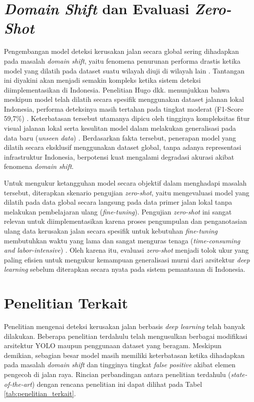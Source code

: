 \section{\textit{Domain Shift} dan Evaluasi \textit{Zero-Shot}}
Pengembangan model deteksi kerusakan jalan secara global sering dihadapkan pada masalah \textit{domain shift}, yaitu fenomena penurunan performa drastis ketika model yang dilatih pada dataset suatu wilayah diuji di wilayah lain \cite{Arya2024846}. Tantangan ini diyakini akan menjadi semakin kompleks ketika sistem deteksi diimplementasikan di Indonesia. Penelitian Hugo dkk. menunjukkan bahwa meskipun model telah dilatih secara spesifik menggunakan dataset jalanan lokal Indonesia, performa deteksinya masih tertahan pada tingkat moderat (F1-Score 59,7\%) \cite{hugo2025efficientdet}. Keterbatasan tersebut utamanya dipicu oleh tingginya kompleksitas fitur visual jalanan lokal serta kesulitan model dalam melakukan generalisasi pada data baru (\textit{unseen data}) \cite{hugo2025efficientdet}. Berdasarkan fakta tersebut, penerapan model yang dilatih secara eksklusif menggunakan dataset global, tanpa adanya representasi infrastruktur Indonesia, berpotensi kuat mengalami degradasi akurasi akibat fenomena \textit{domain shift}.


Untuk mengukur ketangguhan model secara objektif dalam menghadapi masalah tersebut, diterapkan skenario pengujian \textit{zero-shot}, yaitu mengevaluasi model yang dilatih pada data global secara langsung pada data primer jalan lokal tanpa melakukan pembelajaran ulang (\textit{fine-tuning}). Pengujian \textit{zero-shot} ini sangat relevan untuk diimplementasikan karena proses pengumpulan dan penganotasian ulang data kerusakan jalan secara spesifik untuk kebutuhan \textit{fine-tuning} membutuhkan waktu yang lama dan sangat menguras tenaga (\textit{time-consuming and labor-intensive}) \cite{matouq2024ai}. Oleh karena itu, evaluasi \textit{zero-shot} menjadi tolok ukur yang paling efisien untuk mengukur kemampuan generalisasi murni dari arsitektur \textit{deep learning} sebelum diterapkan secara nyata pada sistem pemantauan di Indonesia.

\section{Penelitian Terkait}
Penelitian mengenai deteksi kerusakan jalan berbasis \textit{deep learning} telah banyak dilakukan. Beberapa penelitian terdahulu telah mengusulkan berbagai modifikasi arsitektur YOLO maupun penggunaan dataset yang beragam. Meskipun demikian, sebagian besar model masih memiliki keterbatasan ketika dihadapkan pada masalah \textit{domain shift} dan tingginya tingkat \textit{false positive} akibat elemen pengecoh di jalan raya. Rincian perbandingan antara penelitian terdahulu (\textit{state-of-the-art}) dengan rencana penelitian ini dapat dilihat pada Tabel \ref{tab:penelitian_terkait}.

